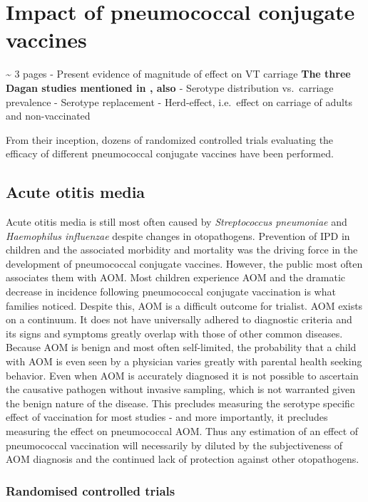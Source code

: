 \documentclass[]{book}
\theoremstyle{definition}
\theoremstyle{definition}
\theoremstyle{definition}
\theoremstyle{remark}
\begin{document}
\section{Impact of pneumococcal conjugate vaccines}\label{impact}

\textasciitilde{} 3 pages - Present evidence of magnitude of effect on
VT carriage \textbf{The three Dagan studies mentioned in
\citep{Eskola2001}, also \citep{Prymula2006, OBrien2007a}} - Serotype
distribution vs.~carriage prevalence - Serotype replacement -
Herd-effect, i.e.~effect on carriage of adults and non-vaccinated

From their inception, dozens of randomized controlled trials evaluating
the efficacy of different pneumococcal conjugate vaccines have been
performed.

\subsection{Acute otitis media}\label{acute-otitis-media-1}

Acute otitis media is still most often caused by \emph{Streptococcus
pneumoniae} and \emph{Haemophilus influenzae} despite changes in
otopathogens. Prevention of IPD in children and the associated morbidity
and mortality was the driving force in the development of pneumococcal
conjugate vaccines. However, the public most often associates them with
AOM. Most children experience AOM and the dramatic decrease in incidence
following pneumococcal conjugate vaccination is what families noticed.
Despite this, AOM is a difficult outcome for trialist. AOM exists on a
continuum. It does not have universally adhered to diagnostic criteria
and its signs and symptoms greatly overlap with those of other common
diseases. Because AOM is benign and most often self-limited, the
probability that a child with AOM is even seen by a physician varies
greatly with parental health seeking behavior. Even when AOM is
accurately diagnosed it is not possible to ascertain the causative
pathogen without invasive sampling, which is not warranted given the
benign nature of the disease. This precludes measuring the serotype
specific effect of vaccination for most studies - and more importantly,
it precludes measuring the effect on pneumococcal AOM. Thus any
estimation of an effect of pneumococcal vaccination will necessarily by
diluted by the subjectiveness of AOM diagnosis and the continued lack of
protection against other otopathogens.

\subsubsection{Randomised controlled
trials}\label{randomised-controlled-trials}
\end{document}
